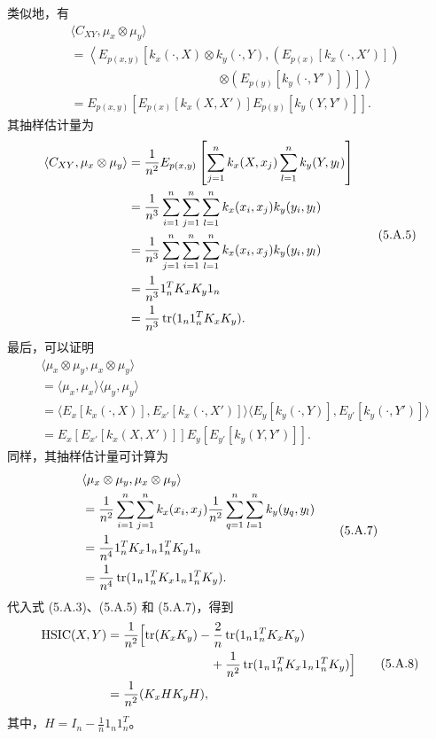 类似地，有
\begin{equation}
\begin{aligned}
&\langle C_{XY},\mu_x\otimes\mu_y\rangle\\
&=\left\langle E_{p(x,y)}\left[k_x(\cdot,X)\otimes k_y(\cdot,Y),
\left(E_{p(x)}[k_x(\cdot,X')]\right)\right.\right.\\
&\hspace{12em}\left.\left.\otimes\left(E_{p(y)}[k_y(\cdot,Y')]\right)\right]\right\rangle\\
&=E_{p(x,y)}\left[E_{p(x)}[k_x(X,X')]E_{p(y)}[k_y(Y,Y')]\right].
\end{aligned}
\tag{5.A.4}
\end{equation}
其抽样估计量为
\begin{equation}
\begin{aligned}
\langle C_{XY},\mu_x\otimes\mu_y\rangle
&=\frac1{n^2}E_{p(x,y)}\left[\sum_{j=1}^nk_x(X,x_j)\sum_{l=1}^nk_y(Y,y_l)\right]\\
&=\frac1{n^3}\sum_{i=1}^n\sum_{j=1}^n\sum_{l=1}^nk_x(x_i,x_j)k_y(y_i,y_l)\\
&=\frac1{n^3}\sum_{j=1}^n\sum_{i=1}^n\sum_{l=1}^nk_x(x_i,x_j)k_y(y_i,y_l)\\
&=\frac1{n^3}1_n^TK_xK_y1_n\\
&=\frac1{n^3}\operatorname{tr}(1_n1_n^TK_xK_y).
\end{aligned}
\tag{5.A.5}
\end{equation}
最后，可以证明
\begin{equation}
\begin{aligned}
&\langle\mu_x\otimes\mu_y,\mu_x\otimes\mu_y\rangle\\
&=\langle\mu_x,\mu_x\rangle\langle\mu_y,\mu_y\rangle\\
&=\langle E_x[k_x(\cdot,X)],E_{x'}[k_x(\cdot,X')]\rangle
\langle E_y[k_y(\cdot,Y)],E_{y'}[k_y(\cdot,Y')]\rangle\\
&=E_x[E_{x'}[k_x(X,X')]]E_y[E_{y'}[k_y(Y,Y')]].
\end{aligned}
\tag{5.A.6}
\end{equation}
同样，其抽样估计量可计算为
\begin{equation}
\begin{aligned}
&\langle\mu_x\otimes\mu_y,\mu_x\otimes\mu_y\rangle\\
&=\frac1{n^2}\sum_{i=1}^n\sum_{j=1}^nk_x(x_i,x_j)
\frac1{n^2}\sum_{q=1}^n\sum_{l=1}^nk_y(y_q,y_l)\\
&=\frac1{n^4}1_n^TK_x1_n1_n^TK_y1_n\\
&=\frac1{n^4}\operatorname{tr}(1_n1_n^TK_x1_n1_n^TK_y).
\end{aligned}
\tag{5.A.7}
\end{equation}
代入式 (5.A.3)、(5.A.5) 和 (5.A.7)，得到
\begin{equation}
\begin{aligned}
\mathrm{HSIC}(X,Y)
={}&\frac1{n^2}\Bigl[\operatorname{tr}(K_xK_y)-\frac2n\operatorname{tr}(1_n1_n^TK_xK_y)\\
&\hspace{7em}+\frac1{n^2}\operatorname{tr}(1_n1_n^TK_x1_n1_n^TK_y)\Bigr]\\
={}&\frac1{n^2}(K_xHK_yH),
\end{aligned}
\tag{5.A.8}
\end{equation}
其中，$H=I_n-\frac1n1_n1_n^T$。


